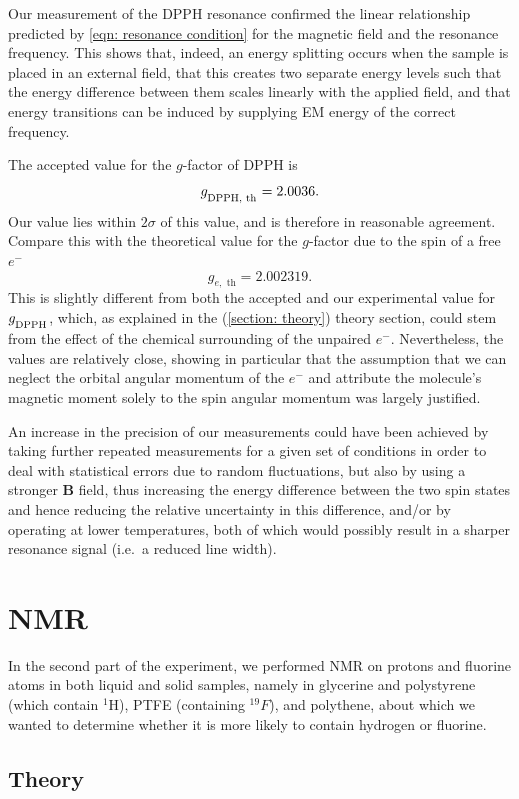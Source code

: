 \documentclass[a4paper]{jpconf}
\numberwithin{equation}{section}
\begin{document}
Our measurement of the DPPH resonance confirmed the linear relationship predicted by \eqref{eqn: resonance condition} for the magnetic field and the resonance frequency. This shows that, indeed, an energy splitting occurs when the sample is placed in an external field, that this creates two separate energy levels such that the energy difference between them scales linearly with the applied field, and that energy transitions can be induced by supplying EM energy of the correct frequency. 

The accepted value for the $g$-factor of DPPH is
\[
	g_{\textsubscript{DPPH, th}} = 2.0036.
\]
Our value lies within $2\sigma$ of this value, and is therefore in reasonable agreement.
Compare this with the theoretical value for the $g$-factor due to the spin of a free $e^-$
\[
	g_{e,\text{ th}} = 2.002319.
\]
This is slightly different from both the accepted and our experimental value for $g_{\textsubscript{DPPH}}$, which, as explained in the (\ref{section: theory}) theory section, could stem from the effect of the chemical surrounding of the unpaired $e^-$. Nevertheless, the values are relatively close, showing in particular that the assumption that we can neglect the orbital angular momentum of the $e^-$ and attribute the molecule's magnetic moment solely to the spin angular momentum was largely justified.

An increase in the precision of our measurements could have been achieved by taking further repeated measurements for a given set of conditions in order to deal with statistical errors due to random fluctuations, but also by using a stronger $\mathbf{B}$ field, thus increasing the energy difference between the two spin states and hence reducing the relative uncertainty in this difference, and/or by operating at lower temperatures, both of which would possibly result in a sharper resonance signal (i.e.\ a reduced line width).


\section{NMR} 
In the second part of the experiment, we performed NMR on protons and fluorine atoms in both liquid and solid samples, namely in glycerine and polystyrene (which contain ${}^1$H), PTFE (containing ${}^{19}F$), and polythene, about which we wanted to determine whether it is more likely to contain hydrogen or fluorine.
\subsection{Theory}
\end{document}

